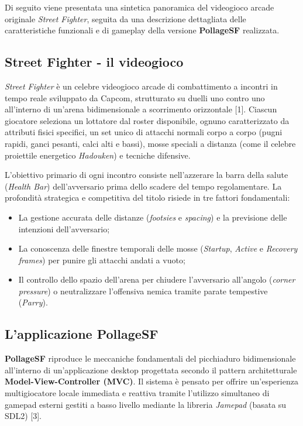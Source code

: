 \documentclass[11pt, a4paper]{article}
\begin{document}
Di seguito viene presentata una sintetica panoramica del videogioco arcade originale \emph{Street Fighter}, seguita da una descrizione dettagliata delle caratteristiche funzionali e di gameplay della versione \textbf{PollageSF} realizzata.

\subsection{Street Fighter - il videogioco}
\emph{Street Fighter} è un celebre videogioco arcade di combattimento a incontri in tempo reale sviluppato da Capcom, strutturato su duelli uno contro uno all'interno di un'arena bidimensionale a scorrimento orizzontale [1]. Ciascun giocatore seleziona un lottatore dal roster disponibile, ognuno caratterizzato da attributi fisici specifici, un set unico di attacchi normali corpo a corpo (pugni rapidi, ganci pesanti, calci alti e bassi), mosse speciali a distanza (come il celebre proiettile energetico \emph{Hadouken}) e tecniche difensive.

L'obiettivo primario di ogni incontro consiste nell'azzerare la barra della salute (\emph{Health Bar}) dell'avversario prima dello scadere del tempo regolamentare. La profondità strategica e competitiva del titolo risiede in tre fattori fondamentali:
\begin{itemize}
    \item La gestione accurata delle distanze (\emph{footsies} e \emph{spacing}) e la previsione delle intenzioni dell'avversario;
    \item La conoscenza delle finestre temporali delle mosse (\emph{Startup}, \emph{Active} e \emph{Recovery frames}) per punire gli attacchi andati a vuoto;
    \item Il controllo dello spazio dell'arena per chiudere l'avversario all'angolo (\emph{corner pressure}) o neutralizzare l'offensiva nemica tramite parate tempestive (\emph{Parry}).
\end{itemize}

\subsection{L'applicazione PollageSF}
\textbf{PollageSF} riproduce le meccaniche fondamentali del picchiaduro bidimensionale all'interno di un'applicazione desktop progettata secondo il pattern architetturale \textbf{Model-View-Controller (MVC)}. Il sistema è pensato per offrire un'esperienza multigiocatore locale immediata e reattiva tramite l'utilizzo simultaneo di gamepad esterni gestiti a basso livello mediante la libreria \emph{Jamepad} (basata su SDL2) [3].
\end{document}
